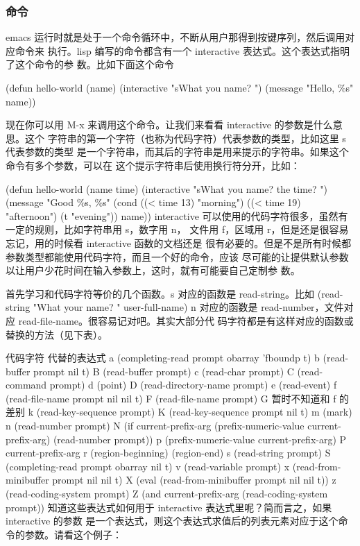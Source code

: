 \documentclass[11pt]{ctexart}
\begin{document}
{{{{\subsubsection{命令}
\label{sec:org655de27}

emacs 运行时就是处于一个命令循环中，不断从用户那得到按键序列，然后调用对应命令来
执行。lisp 编写的命令都含有一个 interactive 表达式。这个表达式指明了这个命令的参
数。比如下面这个命令
\begin{SCR}
(defun hello-world (name)
(interactive "sWhat you name? ")
(message "Hello, \%s" name))
\end{SCR}
现在你可以用 M-x 来调用这个命令。让我们来看看 interactive 的参数是什么意思。这个
字符串的第一个字符（也称为代码字符）代表参数的类型，比如这里 s 代表参数的类型
是一个字符串，而其后的字符串是用来提示的字符串。如果这个命令有多个参数，可以在
这个提示字符串后使用换行符分开，比如：

(defun hello-world (name time)
(interactive "sWhat you name? \nnWhat the time? ")
(message "Good \%s, \%s"
(cond ((< time 13) "morning")
((< time 19) "afternoon")
(t "evening"))
name))
interactive 可以使用的代码字符很多，虽然有一定的规则，比如字符串用 s，数字用 n，
文件用 f，区域用 r，但是还是很容易忘记，用的时候看 interactive 函数的文档还是
很有必要的。但是不是所有时候都参数类型都能使用代码字符，而且一个好的命令，应该
尽可能的让提供默认参数以让用户少花时间在输入参数上，这时，就有可能要自己定制参
数。

首先学习和代码字符等价的几个函数。s 对应的函数是 read-string。比如
(read-string "What your name? " user-full-name)
n 对应的函数是 read-number，文件对应 read-file-name。很容易记对吧。其实大部分代
码字符都是有这样对应的函数或替换的方法（见下表）。

代码字符	代替的表达式
a	(completing-read prompt obarray 'fboundp t)
b	(read-buffer prompt nil t)
B	(read-buffer prompt)
c	(read-char prompt)
C	(read-command prompt)
d	(point)
D	(read-directory-name prompt)
e	(read-event)
f	(read-file-name prompt nil nil t)
F	(read-file-name prompt)
G	暂时不知道和 f 的差别
k	(read-key-sequence prompt)
K	(read-key-sequence prompt nil t)
m	(mark)
n	(read-number prompt)
N	(if current-prefix-arg (prefix-numeric-value current-prefix-arg) (read-number prompt))
p	(prefix-numeric-value current-prefix-arg)
P	current-prefix-arg
r	(region-beginning) (region-end)
s	(read-string prompt)
S	(completing-read prompt obarray nil t)
v	(read-variable prompt)
x	(read-from-minibuffer prompt nil nil t)
X	(eval (read-from-minibuffer prompt nil nil t))
z	(read-coding-system prompt)
Z	(and current-prefix-arg (read-coding-system prompt))
知道这些表达式如何用于 interactive 表达式里呢？简而言之，如果 interactive 的参数
是一个表达式，则这个表达式求值后的列表元素对应于这个命令的参数。请看这个例子：

}}}}
\end{document}
